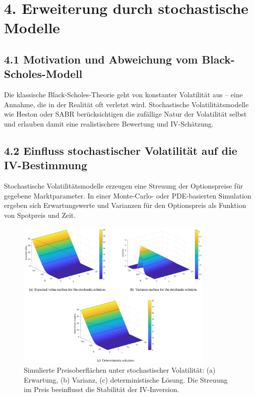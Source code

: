 \documentclass[a4paper,12pt]{article}
\begin{document}
    \vspace{1em}

\clearpage
\section*{4. Erweiterung durch stochastische Modelle}

\subsection*{4.1 Motivation und Abweichung vom Black-Scholes-Modell}
Die klassische Black-Scholes-Theorie geht von konstanter Volatilität aus – eine Annahme, die in der Realität oft verletzt wird. Stochastische Volatilitätsmodelle wie Heston oder SABR berücksichtigen die zufällige Natur der Volatilität selbst und erlauben damit eine realistischere Bewertung und IV-Schätzung.

\subsection*{4.2 Einfluss stochastischer Volatilität auf die IV-Bestimmung}
Stochastische Volatilitätsmodelle erzeugen eine Streuung der Optionspreise für gegebene Marktparameter. In einer Monte-Carlo- oder PDE-basierten Simulation ergeben sich Erwartungswerte und Varianzen für den Optionspreis als Funktion von Spotpreis und Zeit.

\begin{figure}[h]
    \centering
    \includegraphics[width=0.85\textwidth]{fig2.png} %
    \caption{Simulierte Preisoberflächen unter stochastischer Volatilität: (a) Erwartung, (b) Varianz, (c) deterministische Lösung. Die Streuung im Preis beeinflusst die Stabilität der IV-Inversion.}
\end{figure}
\end{document}
